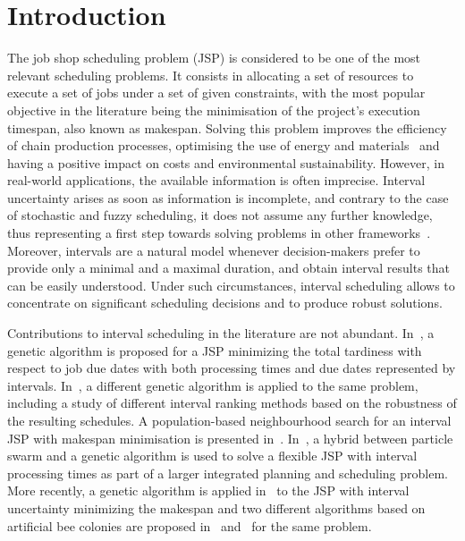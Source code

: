 \documentclass[sn-mathphys]{sn-jnl}%
\theoremstyle{thmstyleone}%
\theoremstyle{thmstyletwo}%
\theoremstyle{thmstylethree}%
\begin{document}



\maketitle
\section{Introduction}\label{SecIntro}
The job shop scheduling problem (JSP) is considered to be one of the most relevant scheduling problems. It consists in allocating a set of resources to execute a set of jobs under a set of given constraints, with the most popular objective in the literature being the minimisation of the project's execution timespan, also known as makespan. Solving this problem improves the efficiency of chain production processes, optimising the use of energy and materials~\cite{Pinedo2016} and having a positive impact on costs and environmental sustainability. However, in real-world applications, the available information is often imprecise. Interval uncertainty arises as soon as information is incomplete, and contrary to the case of stochastic and fuzzy scheduling, it does not assume any further knowledge, thus representing a first step towards solving problems in other frameworks~\cite{Allahverdi2014}. Moreover, intervals are a natural model whenever decision-makers prefer to provide only a minimal and a maximal duration, and obtain interval results that can be easily understood. Under such circumstances, interval scheduling allows to concentrate on significant scheduling decisions and to produce robust solutions.

Contributions to interval scheduling in the literature are not abundant. In~\cite{Lei2012c}, a genetic algorithm is proposed for a JSP minimizing the total tardiness with respect to job due dates with both processing times and due dates represented by intervals. In~\cite{Diaz2022robust}, a different genetic algorithm is applied to the same problem, including a study of different interval ranking methods based on the robustness of the resulting schedules. A population-based neighbourhood search for an interval JSP with makespan minimisation is presented in~\cite{Lei2011}. In~\cite{Li2019}, a hybrid between particle swarm and a genetic algorithm is used to solve a flexible JSP with interval processing times as part of a larger integrated planning and scheduling problem. More recently, a genetic algorithm is applied in~\cite{Diaz2020genetic} to the JSP with interval uncertainty minimizing the makespan and two different algorithms based on artificial bee colonies are proposed in~\cite{Diaz2022} and~\cite{Diaz2023-ICAE} for the same problem.
\end{document}

